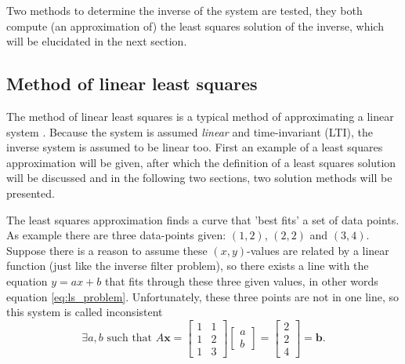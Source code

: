 Two methods to determine the inverse of the system are tested, they both compute (an approximation of) the least squares solution of the inverse, which will be elucidated in the next section.

\subsection{Method of linear least squares}
\label{ssec:ls}


The method of linear least squares is a typical method of approximating a linear system \cite[p.~580-584]{book:poole} \cite[p.~483-525]{book:adaptivefiltertheory}.
Because the system is assumed \emph{linear} and time-invariant (LTI), the inverse system is assumed to be linear too.
First an example of a least squares approximation will be given, after which the definition of a least squares solution will be discussed and in the following two sections, two solution methods will be presented.

The least squares approximation finds a curve that 'best fits' a set of data points.
As example there are three data-points given: $(1,2)$, $(2,2)$ and $(3,4)$.
Suppose there is a reason to assume these $(x,y)$-values are related by a linear function (just like the inverse filter problem), so there exists a line with the equation $y=ax+b$ that fits through these three given values, in other words equation \eqref{eq:ls_problem}.
Unfortunately, these three points are not in one line, so this system is called inconsistent
\begin{equation}
\label{eq:ls_problem}
\exists a,b\text{ such that }A\mathbf{x}=\left[
\begin{array}{cc}
1&1\\
1&2\\
1&3
\end{array}
\right]\left[
\begin{array}{c}
a\\
b
\end{array}\right]=\left[\begin{array}{c}
2\\
2\\
4
\end{array}\right]=\mathbf{b}.
\end{equation}

